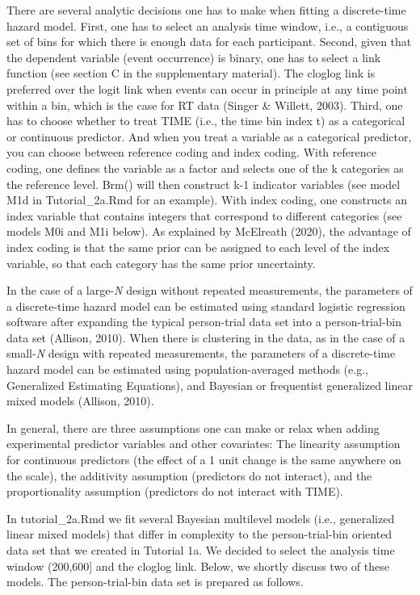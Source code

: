 \documentclass[
  man, donotrepeattitle,floatsintext]{apa6}
\begin{document}
There are several analytic decisions one has to make when fitting a discrete-time hazard model. First, one has to select an analysis time window, i.e., a contiguous set of bins for which there is enough data for each participant. Second, given that the dependent variable (event occurrence) is binary, one has to select a link function (see section C in the supplementary material). The cloglog link is preferred over the logit link when events can occur in principle at any time point within a bin, which is the case for RT data (Singer \& Willett, 2003). Third, one has to choose whether to treat TIME (i.e., the time bin index t) as a categorical or continuous predictor. And when you treat a variable as a categorical predictor, you can choose between reference coding and index coding. With reference coding, one defines the variable as a factor and selects one of the k categories as the reference level. Brm() will then construct k-1 indicator variables (see model M1d in Tutorial\_2a.Rmd for an example). With index coding, one constructs an index variable that contains integers that correspond to different categories (see models M0i and M1i below). As explained by McElreath (2020), the advantage of index coding is that the same prior can be assigned to each level of the index variable, so that each category has the same prior uncertainty.

In the case of a large-\emph{N} design without repeated measurements, the parameters of a discrete-time hazard model can be estimated using standard logistic regression software after expanding the typical person-trial data set into a person-trial-bin data set (Allison, 2010). When there is clustering in the data, as in the case of a small-\emph{N} design with repeated measurements, the parameters of a discrete-time hazard model can be estimated using population-averaged methods (e.g., Generalized Estimating Equations), and Bayesian or frequentist generalized linear mixed models (Allison, 2010).

In general, there are three assumptions one can make or relax when adding experimental predictor variables and other covariates: The linearity assumption for continuous predictors (the effect of a 1 unit change is the same anywhere on the scale), the additivity assumption (predictors do not interact), and the proportionality assumption (predictors do not interact with TIME).

In tutorial\_2a.Rmd we fit several Bayesian multilevel models (i.e., generalized linear mixed models) that differ in complexity to the person-trial-bin oriented data set that we created in Tutorial 1a. We decided to select the analysis time window (200,600{]} and the cloglog link. Below, we shortly discuss two of these models. The person-trial-bin data set is prepared as follows.
\end{document}
